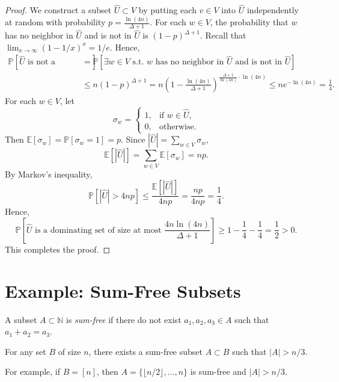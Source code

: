 \documentclass[letterpaper, reqno,11pt]{article}
\newcommand{\NN}{\mathbb{N}}
\newcommand{\PP}{\mathbb{P}}
\newcommand{\EE}{\mathbb{E}}
\begin{document}
\begin{proof}
  We construct a subset $\hat{U} \subset V$ by putting each $v \in V$ into $\hat{U}$ independently at random with probability $p = \frac{\ln(4n)}{\Delta + 1}$. For each $w \in V$, the probability that $w$ has no neighbor in $\hat{U}$ and is not in $\hat{U}$ is $(1 - p)^{\Delta + 1}$. Recall that $\lim_{x \to \infty} (1 - 1/x)^x = 1/e$. Hence,
  \begin{align*}
    \PP\left[\text{$\hat{U}$ is not a dominating set}\right] &= \PP\left[\exists w \in V \text{ s.t.\ $w$ has no neighbor in $\hat{U}$ and is not in $\hat{U}$}\right] \\
    &\leq n (1 - p)^{\Delta + 1} = n\left(1 - \frac{\ln(4n)}{\Delta + 1}\right)^{\frac{\Delta + 1}{\ln(4n)} \cdot \ln(4n)} \leq ne^{-\ln(4n)} = \frac{1}{4}.
  \end{align*}
  For each $w \in V$, let
  $$ \sigma_w = \left\{
    \begin{array}{ll}
      1, & \text{if $w \in \hat{U}$}, \\
      0, & \text{otherwise}.
    \end{array}
  \right. $$
  Then $\EE[\sigma_w] = \PP[\sigma_w = 1] = p$. Since $|\hat{U}| = \sum_{w \in V} \sigma_w$,
  $$ \EE\left[\left|\hat{U}\right|\right] = \sum_{w \in V} \EE\left[\sigma_w\right] = np. $$
  By Markov's inequality,
  $$ \PP\left[\left|\hat{U}\right| > 4np\right] \leq \frac{\EE\left[\left|\hat{U}\right|\right]}{4np} = \frac{np}{4np} = \frac{1}{4}. $$
  Hence,
  $$ \PP\left[\text{$\hat{U}$ is a dominating set of size at most $\frac{4n\ln(4n)}{\Delta + 1}$}\right] \geq 1 - \frac{1}{4} - \frac{1}{4} = \frac{1}{2} > 0. $$
  This completes the proof.
\end{proof}

\section{Example: Sum-Free Subsets}

\begin{definition}
  A subset $A \subset \NN$ is \emph{sum-free} if there do not exist $a_1, a_2, a_3 \in A$ such that $a_1 + a_2 = a_3$.
\end{definition}

\begin{theorem}[Erd\H{o}s '65]
  For any set $B$ of size $n$, there exists a sum-free subset $A \subset B$ such that $|A| > n/3$.
\end{theorem}

For example, if $B = [n]$, then $A = \{ \lfloor n/2 \rfloor, \ldots, n \}$ is sum-free and $|A| > n/3$.
\end{document}
